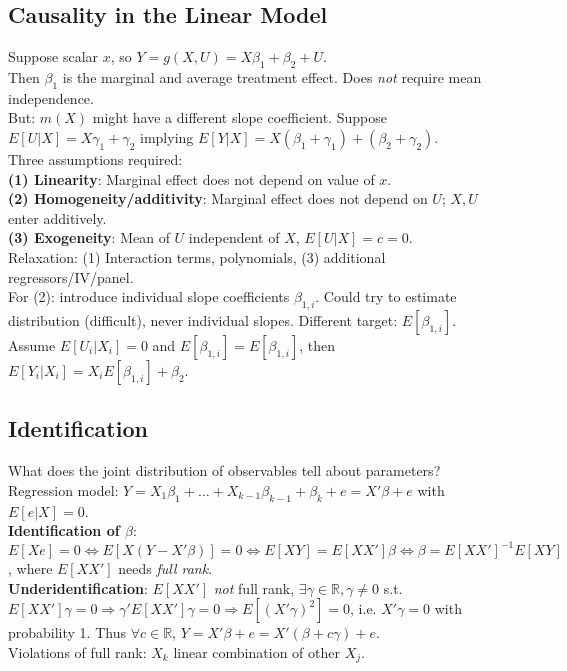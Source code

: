 \subsection{Causality in the Linear Model}
Suppose scalar $x$, so $Y = g(X,U) = X\beta_1 + \beta_2 + U$.\\
Then $\beta_1$ is the marginal and average treatment effect. Does \textit{not} require mean independence.\\
But: $m(X)$ might have a different slope coefficient. Suppose $E[U|X] = X\gamma_1 + \gamma_2$ implying $E[Y|X] = X(\beta_1+\gamma_1) + (\beta_2 + \gamma_2)$.\\
Three assumptions required:\\
\textbf{(1) Linearity}: Marginal effect does not depend on value of $x$.\\
\textbf{(2) Homogeneity/additivity}: Marginal effect does not depend on $U$; $X, U$ enter additively.\\
\textbf{(3) Exogeneity}: Mean of $U$ independent of $X$, $E[U|X] = c = 0$.\\
Relaxation: (1) Interaction terms, polynomials, (3) additional regressors/IV/panel.\\
For (2): introduce individual slope coefficients $\beta_{1,i}$. Could try to estimate distribution (difficult), never individual slopes. Different target: $E[\beta_{1,i}]$.\\
Assume $E[U_i|X_i] = 0$ and $E[\beta_{1,i}] = E[\beta_{1,i}]$, then $E[Y_i|X_i] = X_iE[\beta_{1,i}] + \beta_2$.\\

\subsection{Identification}
What does the joint distribution of observables tell about parameters?\\
Regression model: $Y = X_1\beta_1 + \ldots + X_{k-1}\beta_{k-1} + \beta_k + e =X'\beta + e$ with $E[e|X] = 0$.\\
\textbf{Identification of $\beta$}: $E[Xe] = 0 \Leftrightarrow E[X(Y-X'\beta)] = 0 \Leftrightarrow E[XY] = E[XX']\beta \Leftrightarrow \beta = E[XX']^{-1}E[XY]$, where $E[XX']$ needs \textit{full rank}.\\
\textbf{Underidentification}: $E[XX']$ \textit{not} full rank, $\exists \gamma \in \mathbb{R}, \gamma \neq 0$ s.t. $E[XX']\gamma = 0 \Rightarrow \gamma' E[XX']\gamma = 0 \Rightarrow E[(X'\gamma)^2] = 0$, i.e. $X'\gamma = 0$ with probability 1. Thus $\forall c\in\mathbb{R}$, $Y = X'\beta + e = X'(\beta + c\gamma) + e$.\\
Violations of full rank: $X_k$ linear combination of other $X_j$.